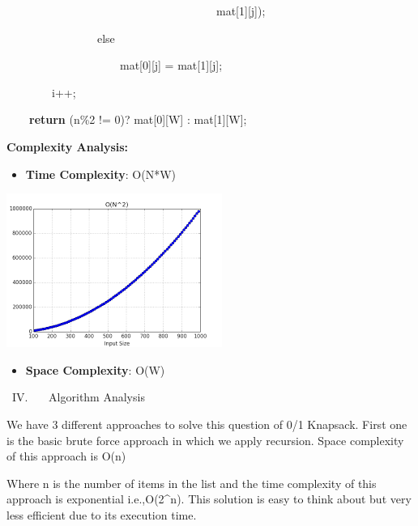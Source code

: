 \documentclass[letterpaper]{article}
\newcommand\liststyleWWNumv{%
\renewcommand\labelitemi{\ding{108}}
\renewcommand\labelitemii{{\BigCircle}}
\renewcommand\labelitemiii{\ding{110}}
\renewcommand\labelitemiv{\ding{108}}
}
\begin{document}
\begin{multicols}{2}
{\color[rgb]{0.2509804,0.25882354,0.30588236}
\ \ \ \ \ \ \ \ \ \ \ \ \ \ \ \ \ \ \ \ \ \ \ \ \ \ \ \ \ \ \ \ \ \ \ \ \ mat[1][j]);}

{\color[rgb]{0.2509804,0.25882354,0.30588236}
\ \ \ \ \ \ \ \ \ \ \ \ \ \ \ \ else}

{\color[rgb]{0.2509804,0.25882354,0.30588236}
\ \ \ \ \ \ \ \ \ \ \ \ \ \ \ \ \ \ \ \ mat[0][j] = mat[1][j];}

{\color[rgb]{0.2509804,0.25882354,0.30588236}
\ \ \ \ \ \ \ \ i++;}


\bigskip

\textcolor[rgb]{0.2509804,0.25882354,0.30588236}{\ \ \ \ }\textbf{\textcolor[rgb]{0.2509804,0.25882354,0.30588236}{return}}\textcolor[rgb]{0.2509804,0.25882354,0.30588236}{
(n\%2 != 0)? mat[0][W] : mat[1][W];}


\bigskip
{\bfseries
Complexity Analysis:}


\bigskip

\liststyleWWNumv
\begin{itemize}
\item \textbf{Time Complexity}: O(N*W) 
\end{itemize}

\bigskip
\includegraphics[scale=1.0]{complexity}

\bigskip

\liststyleWWNumv
\begin{itemize}
\item \textbf{Space Complexity}: O(W) 
\end{itemize}

\bigskip
{\mdseries
\ IV. \ \ \ Algorithm Analysis}

We have 3 different approaches to solve this question of 0/1 Knapsack. First one is the basic brute force approach in
which we apply recursion. Space complexity of this approach is O(n)

Where n is the number of items in the list and the time complexity of this approach is exponential i.e.,O(2\^{}n). This
solution is easy to think about but very less efficient due to its execution time.



\end{multicols}
\end{document}
